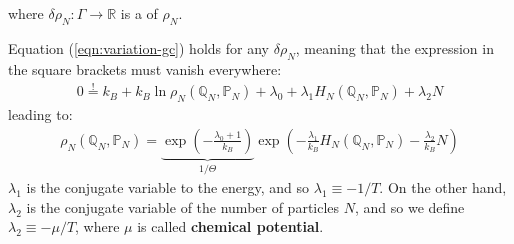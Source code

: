 \documentclass[../template.tex]{subfiles}
\begin{document}
where $\delta \rho_N \colon \Gamma \to \mathbb{R}$ is a  of $\rho_N$. 

\medskip

Equation (\ref{eqn:variation-gc}) holds for any $\delta \rho_N$, meaning that the expression in the square brackets must vanish everywhere:
\begin{align*}
    0 \overset{!}{=} k_B + k_B \ln \rho_N(\mathbb{Q}_N, \mathbb{P}_N) + \lambda_0 + \lambda_1 H_N(\mathbb{Q}_N, \mathbb{P}_N) + \lambda_2 N
\end{align*}
leading to:
\begin{align*}
    \rho_N(\mathbb{Q}_N, \mathbb{P}_N) = \underbrace{\exp\left(-\frac{\lambda_0 + 1}{k_B} \right) }_{1/\Theta}\exp\left(-\frac{\lambda_1}{k_B} H_N(\mathbb{Q}_N, \mathbb{P}_N) - \frac{\lambda_2}{k_B} N  \right)
\end{align*}
$\lambda_1$ is the conjugate variable to the energy, and so $\lambda_1 \equiv -1/T$. On the other hand, $\lambda_2$ is the conjugate variable of the number of particles $N$, and so we define $\lambda_2 \equiv -\mu/T$, where $\mu$ is called \textbf{chemical potential}. %
\end{document}
